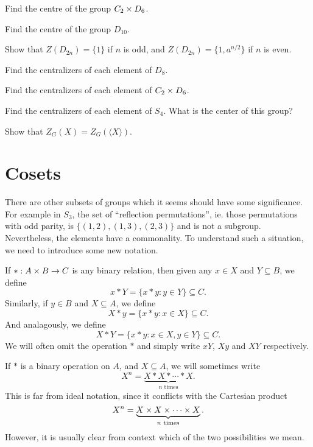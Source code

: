 \begin{exercises}
  \item  Find the centre of the group $C_{2} \times D_{6}$.
  
  \item  Find the centre of the group $D_{10}$.
  
  \item  Show that $Z(D_{2n}) = \{1\}$ if $n$ is odd, and $Z(D_{2n}) = 
    \{1, a^{n/2}\}$ if $n$ is even.
  
  \item  Find the centralizers of each element of $D_{8}$.
  
  \item  Find the centralizers of each element of $C_{2} \times D_{6}$.
  
  \item  Find the centralizers of each element of $S_{4}$.  What is 
    the center of this group?
  
  \item  Show that $Z_{G}(X) = Z_{G}(\langle X \rangle)$.
\end{exercises}


\section{Cosets}

There are other subsets of groups which it seems should have some
significance.  For example in $S_{3}$, the set of ``reflection
permutations'', ie.  those permutations with odd parity, is $\{ (1,2),
(1,3), (2,3) \}$ and is not a subgroup.  Nevertheless, the elements
have a commonality.  To understand such a situation, we need to
introduce some new notation.

If $\ast: A \times B \to C$ is any binary relation, then given any 
$x \in X$ and $Y \subseteq B$, we define
\[
  x \ast Y = \{ x \ast y: y \in Y\} \subseteq C.
\]
Similarly, if $y \in B$ and $X \subseteq A$, we define
\[
  X \ast y = \{ x \ast y: x \in X\} \subseteq C.
\]
And analagously, we define
\[
  X \ast Y = \{ x \ast y: x \in X, y \in Y\} \subseteq C.
\]
We will often omit the operation $\ast$ and simply write $xY$, $Xy$ 
and $XY$ respectively.

If $\ast$ is a binary operation on $A$, and $X \subseteq A$, we will 
sometimes write
\[
  X^{n} = \underbrace{X \ast X \ast \cdots \ast X}_{\text{$n$ times}}.
\]
This is far from ideal notation, since it conflicts with the 
Cartesian product
\[
  X^{n} = \underbrace{X \times X \times \cdots \times X}_{\text{$n$ times}}.
\]
However, it is usually clear from context which of the two 
possibilities we mean.

